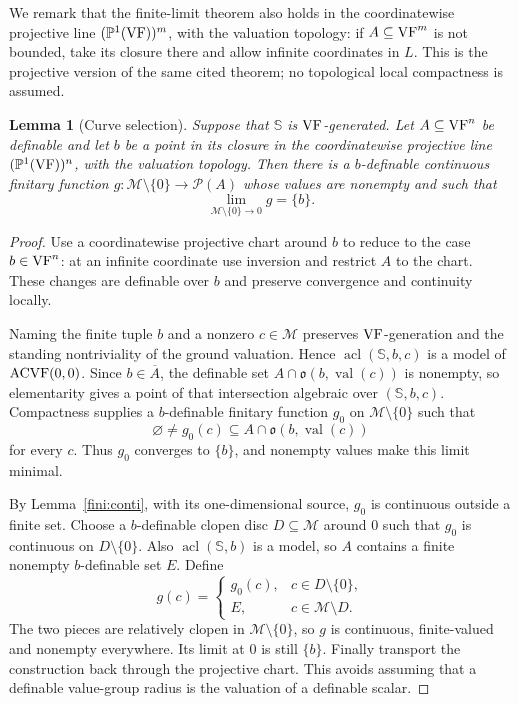 \documentclass[12pt]{amsart}
\theoremstyle{plain}
\newtheorem{lem}[thm]{Lemma}
\theoremstyle{definition}
\theoremstyle{remark}
\numberwithin{equation}{section}
\theoremstyle{plain}
\newcommand{\VF}{\textup{VF}}
\newcommand{\ACVF}{\textup{ACVF}}
\newcommand{\MM}{\mdl M}
\DeclareMathOperator{\acl}{acl}
\newcommand{\go}{\mathfrak{o}}
\newcommand{\0}{\emptyset}
\newcommand{\mdl}[1]{\mathcal{#1}}  %
\newcommand{\fun}{\longrightarrow}
\newcommand{\sub}{\subseteq}
\DeclareMathOperator{\vv}{val}
\begin{document}
We remark that the finite-limit theorem also holds in the coordinatewise projective line $(\mathbb P^1(\VF))^m$, with the valuation topology: if $A\subseteq\VF^m$ is not bounded, take its closure there and allow infinite coordinates in $L$. This is the projective version of the same cited theorem; no topological local compactness is assumed.


\begin{lem}[Curve selection]\label{curve:select}
Suppose that $\mathbb S$ is $\VF$-generated. Let $A\sub\VF^n$ be definable and let $b$ be a point in its closure in the coordinatewise projective line $(\mathbb P^1(\VF))^n$, with the valuation topology. Then there is a $b$-definable continuous finitary function $g:\MM\setminus\{0\}\fun\mdl P(A)$ whose values are nonempty and such that
\[
\lim_{\MM\setminus\{0\}\to0}g=\{b\}.
\]
\end{lem}
\begin{proof}
Use a coordinatewise projective chart around $b$ to reduce to the case $b\in\VF^n$: at an infinite coordinate use inversion and restrict $A$ to the chart. These changes are definable over $b$ and preserve convergence and continuity locally.

Naming the finite tuple $b$ and a nonzero $c\in\MM$ preserves $\VF$-generation and the standing nontriviality of the ground valuation. Hence $\acl(\mathbb S,b,c)$ is a model of $\ACVF(0,0)$. Since $b\in\overline A$, the definable set $A\cap\go(b,\vv(c))$ is nonempty, so elementarity gives a point of that intersection algebraic over $(\mathbb S,b,c)$. Compactness supplies a $b$-definable finitary function $g_0$ on $\MM\setminus\{0\}$ such that
\[
\varnothing\ne g_0(c)\sub A\cap\go(b,\vv(c))
\]
for every $c$. Thus $g_0$ converges to $\{b\}$, and nonempty values make this limit minimal.

By Lemma~\ref{fini:conti}, with its one-dimensional source, $g_0$ is continuous outside a finite set. Choose a $b$-definable clopen disc $D\sub\MM$ around $0$ such that $g_0$ is continuous on $D\setminus\{0\}$. Also $\acl(\mathbb S,b)$ is a model, so $A$ contains a finite nonempty $b$-definable set $E$. Define
\[
g(c)=\begin{cases}
g_0(c),&c\in D\setminus\{0\},\\
E,&c\in\MM\setminus D.
\end{cases}
\]
The two pieces are relatively clopen in $\MM\setminus\{0\}$, so $g$ is continuous, finite-valued and nonempty everywhere. Its limit at $0$ is still $\{b\}$. Finally transport the construction back through the projective chart. This avoids assuming that a definable value-group radius is the valuation of a definable scalar.
\end{proof}
\end{document}
